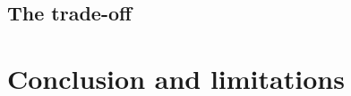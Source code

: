 \documentclass[10pt,twocolumn]{article}
\begin{document}
\subsection{The trade-off}

\section{Conclusion and limitations}


\end{document}
